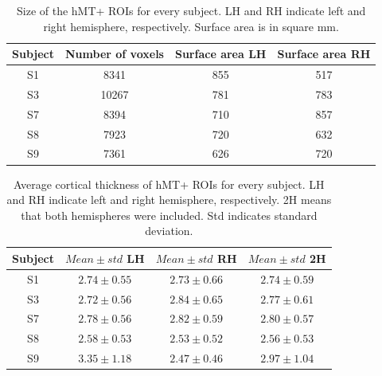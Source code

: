 \begin{table}[htbp!]
\centering
\caption{Size of the hMT+ ROIs for every subject. LH and RH indicate left and right hemisphere, respectively. Surface area is in square mm.}
\begin{tabular}{cccc}
\\
\hline
Subject & Number of voxels & Surface area LH & Surface area RH
\\
\midrule
S1 & 8341 & 855 & 517\\
S3 & 10267 & 781 & 783\\
S7 & 8394 & 710 & 857\\
S8 & 7923 & 720 & 632\\
S9 & 7361 & 626 & 720\\
\bottomrule
\end{tabular}
\label{tab:rois}
\end{table}

\begin{table}[htbp!]
\centering
\caption{Average cortical thickness of hMT+ ROIs for every subject. LH and RH indicate left and right hemisphere, respectively. 2H means that both hemispheres were included. Std indicates standard deviation.}
\begin{tabular}{cccc}
\\
\hline
Subject & $Mean\pm std$ LH & $Mean\pm std$ RH & $Mean\pm std$ 2H 
\\
\midrule
S1 & $2.74\pm0.55$ &  $2.73\pm0.66$ &  $2.74\pm0.59$\\
S3 & $2.72\pm0.56$ &  $2.84\pm0.65$ &  $2.77\pm0.61$\\
S7 & $2.78\pm0.56$ &  $2.82\pm0.59$ &  $2.80\pm0.57$\\
S8 & $2.58\pm0.53$ &  $2.53\pm0.52$ &  $2.56\pm0.53$\\
S9 & $3.35\pm1.18$ &  $2.47\pm0.46$ &  $2.97\pm1.04$\\
\bottomrule
\end{tabular}
\label{tab:thickness}
\end{table}

